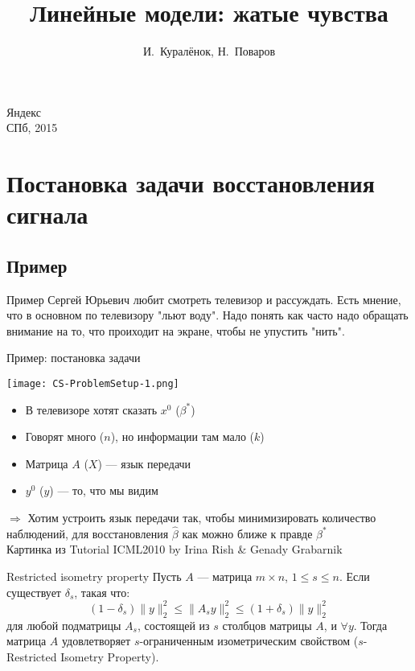 \documentclass[14pt, fleqn, xcolor={dvipsnames, table}]{beamer}
\title{Линейные модели: жатые чувства\\\small{}}
\author[]{\small{%
И.~Куралёнок,
Н.~Поваров}}
\date{}
\begin{document}
\begin{frame}

\maketitle
\small
\begin{center}
\vspace{-60pt}
\normalsize {\color{red}Я}ндекс \\
\vspace{80pt}
\footnotesize СПб, 2015
\end{center}
\end{frame}

\section{Постановка задачи восстановления сигнала}
\subsection{Пример}
\begin{frame}{Пример}
Сергей Юрьевич любит смотреть телевизор и рассуждать. Есть мнение, что в основном по телевизору "льют воду".
Надо понять как часто надо обращать внимание на то, что проиходит на экране, чтобы не упустить "нить".
\end{frame}
\begin{frame}{Пример: постановка задачи}
\begin{center}
\texttt{[image: CS-ProblemSetup-1.png]}
\end{center}
\vspace{-2em}
\small
\begin{itemize}
  \item В телевизоре хотят сказать $x^0$ ($\beta^*$)
  \item Говорят много ($n$), но информации там мало ($k$)
  \item Матрица $A$ ($X$) --- язык передачи
  \item $y^0$ ($y$) --- то, что мы видим
\end{itemize}
\footnotesize
$\Rightarrow$ Хотим устроить язык передачи так, чтобы минимизировать количество наблюдений, для восстановления $\hat{\beta}$ как можно ближе к правде $\beta^*$\\
\tiny Картинка из Tutorial ICML2010 by Irina Rish \& Genady Grabarnik
\end{frame}

\begin{frame}{Restricted isometry property}
Пусть $A$ --- матрица $m\times n$, $1 \le s \le n$. Если существует $\delta_s$, такая что:
$$
(1-\delta_s)\|y\|^2_2 \le \|A_sy\|^2_2 \le (1+\delta_s)\|y\|^2_2
$$
для любой подматрицы $A_s$, состоящей из $s$ столбцов матрицы $A$, и $\forall y$. Тогда матрица $A$ удовлетворяет $s$-ограниченным изометрическим свойством ($s$-Restricted Isometry Property).
\end{frame}
\end{document}
